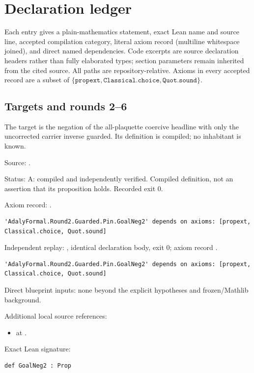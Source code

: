 \section{Declaration ledger}

Each entry gives a plain-mathematics statement, exact Lean name and source line, accepted compilation category, literal axiom record (multiline whitespace joined), and direct named dependencies. Code excerpts are source declaration headers rather than fully elaborated types; section parameters remain inherited from the cited source. All paths are repository-relative. Axioms in every accepted record are a subset of \(\{\texttt{propext},\texttt{Classical.choice},\texttt{Quot.sound}\}\).



\subsection{Targets and rounds 2–6}

\begin{definition}[bp-001]
\label{bp-001}
\uses{}
\leanok
The target is the negation of the all-plaquette coercive headline with only the uncorrected carrier inverse guarded. Its definition is compiled; no inhabitant is known.

\par Source: \texttt{}.
\par Status: A: compiled and independently verified. Compiled definition, not an assertion that its proposition holds. Recorded exit 0.
\par Axiom record: \texttt{}.
\begin{verbatim}
'AdalyFormal.Round2.Guarded.Pin.GoalNeg2' depends on axioms: [propext, Classical.choice, Quot.sound]
\end{verbatim}
\par Independent replay: \texttt{}, identical declaration body, exit 0; axiom record \texttt{}.
\begin{verbatim}
'AdalyFormal.Round2.Guarded.Pin.GoalNeg2' depends on axioms: [propext, Classical.choice, Quot.sound]
\end{verbatim}
\par Direct blueprint inputs: none beyond the explicit hypotheses and frozen/Mathlib background.
\par Additional local source references:
\begin{itemize}
\item \texttt{} at \texttt{}.
\end{itemize}
\par Exact Lean signature:
\begin{verbatim}
def GoalNeg2 : Prop
\end{verbatim}
\end{definition}


